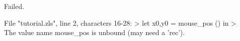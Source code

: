 \runverbatimfalse
{}
\begin{RunVerbatimMsg}
Failed.
\end{RunVerbatimMsg}
\begin{RunVerbatimErr}
File "tutorial.zls", line 2, characters 16-28:
>    let x0,y0 = mouse_pos () in
>                ^^^^^^^^^^^^
The value name mouse_pos is unbound (may need a 'rec').
\end{RunVerbatimErr}
